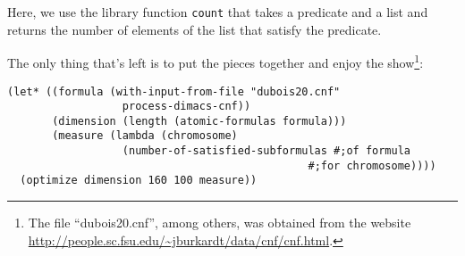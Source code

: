 Here, we use the library function \texttt{count} that takes
a predicate and a list and returns the number of elements
of the list that satisfy the predicate.

The only thing that's left is to put the pieces together
and enjoy the show\footnote{The file ``dubois20.cnf'',
among others, was obtained from the website
\url{http://people.sc.fsu.edu/~jburkardt/data/cnf/cnf.html}.}:

\begin{Verbatim}[samepage=true]
(let* ((formula (with-input-from-file "dubois20.cnf" 
                  process-dimacs-cnf))
       (dimension (length (atomic-formulas formula)))
       (measure (lambda (chromosome)
                  (number-of-satisfied-subformulas #;of formula
                                               #;for chromosome))))
  (optimize dimension 160 100 measure))
\end{Verbatim}
